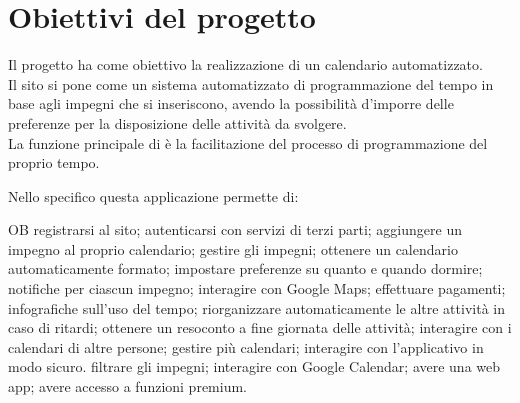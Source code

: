 \section{Obiettivi del progetto}
\label{sec:ObiettiviProgetto}
Il progetto ha come obiettivo la realizzazione di un calendario automatizzato.\\
Il sito si pone come un sistema automatizzato di programmazione del tempo in base agli impegni che si inseriscono, avendo la possibilità d'imporre delle preferenze per la disposizione delle attività da svolgere.\\
La funzione principale di \nome è la facilitazione del processo di programmazione del proprio tempo.

\vspace{0.5cm}

Nello specifico questa applicazione permette di:
\begin {listaPersonale} {OB}
       registrarsi al sito;
       autenticarsi con servizi di terzi parti;
       aggiungere un impegno al proprio calendario;
       gestire gli impegni;
       ottenere un calendario automaticamente formato;
       impostare preferenze su quanto e quando dormire;
       notifiche per ciascun impegno;
       interagire con Google Maps;
       effettuare pagamenti;
       infografiche sull'uso del tempo;
       riorganizzare automaticamente le altre attività in caso di ritardi;
       ottenere un resoconto a fine giornata delle attività;
       interagire con i calendari di altre persone;
       gestire più calendari;
       interagire con l'applicativo in modo sicuro.
       filtrare gli impegni;
       interagire con Google Calendar;
       avere una web app;
       avere accesso a funzioni premium.
\end{listaPersonale}
